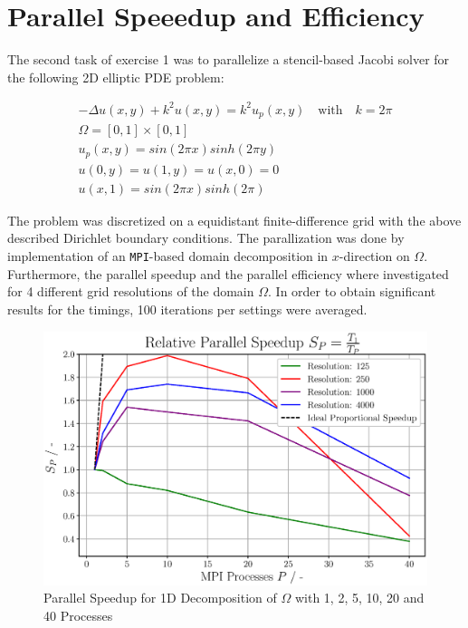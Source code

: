 \section*{Parallel Speeedup and Efficiency}

The second task of exercise 1 was to parallelize a stencil-based Jacobi solver for the following 2D elliptic PDE problem:

\begin{gather*}
-\Delta u(x,y) + k^2 u(x,y) = k^2 u_p(x,y) \quad \text{with} \quad k=2\pi \\
\Omega = \left[ 0,1 \right] \times\left[ 0,1 \right] \\
u_p(x,y) = sin(2 \pi x ) sinh(2 \pi y) \\
u(0,y) = u(1,y) = u(x,0) = 0 \\
u(x,1) = sin(2 \pi x ) sinh(2\pi) 
\end{gather*}

The problem was discretized on a equidistant finite-difference grid with the above described Dirichlet boundary conditions.
The parallization was done by implementation of an \texttt{MPI}-based domain decomposition  in $x$-direction on $\Omega$.
Furthermore, the parallel speedup and the parallel efficiency where investigated for 4 different grid resolutions of the domain $\Omega$.
In order to obtain significant results for the timings, 100 iterations per settings were averaged.

\begin{figure}[ht]
    \centering
    \includegraphics[width=1\textwidth]{figures/S_P_rel.eps}
	\caption{Parallel Speedup for 1D Decomposition of $\Omega$ with 1, 2, 5, 10, 20 and 40 Processes}
	\label{speedup_fig}
\end{figure}

